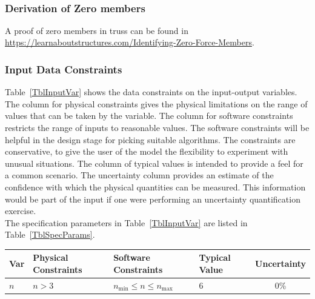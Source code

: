 \documentclass[12pt]{article}
\begin{document}
~\newline

\subsubsection*{Derivation of Zero members}
A proof of zero members in truss can be found in \url{https://learnaboutstructures.com/Identifying-Zero-Force-Members}.


\subsubsection{Input Data Constraints} \label{sec_DataConstraints}    

Table~\ref{TblInputVar} shows the data constraints on the input-output
variables.  The column for physical constraints gives the physical limitations
on the range of values that can be taken by the variable.  The column for software constraints restricts the range of inputs to reasonable values.  The software constraints will be helpful in the design stage for picking suitable algorithms.  The constraints are conservative, to give the user of the model the flexibility to experiment with unusual situations.  The column of typical values is intended to provide a feel for a common scenario.  The uncertainty column provides an estimate of the confidence with which the physical quantities can be
measured.  This information would be part of the input if one were performing an
uncertainty quantification exercise.\\
The specification parameters in Table~\ref{TblInputVar} are listed in
Table~\ref{TblSpecParams}.

\begin{table}[!h]
  \caption{Input Variables} \label{TblInputVar}
  \renewcommand{\arraystretch}{1.2}
\noindent \begin{longtable*}{l l l l c} 
  \toprule
  \textbf{Var} & \textbf{Physical Constraints} & \textbf{Software Constraints} &
                             \textbf{Typical Value} & \textbf{Uncertainty}\\
  \midrule 
  $n$ & $n > 3$ & $n_{\text{min}} \leq n \leq n_{\text{max}}$ & 6  & 0\%
  \\
  \bottomrule
\end{longtable*}
\end{table}
\end{document}
